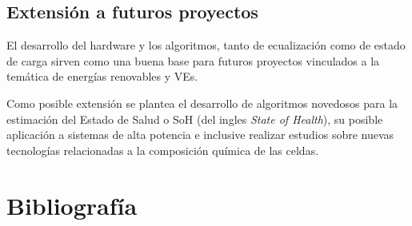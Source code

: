 \documentclass[10pt,a4paper]{article}
\begin{document}
	\subsection{Extensión a futuros proyectos}
	
	El desarrollo del hardware y los algoritmos, tanto de ecualización como de 
    estado de carga sirven como una buena base para futuros proyectos vinculados 
    a la temática de energías renovables y VEs.

	Como posible extensión se plantea el desarrollo de algoritmos novedosos para 
    la estimación del Estado de Salud o SoH (del ingles \emph{State of Health}), 
    su posible aplicación a sistemas de alta potencia e inclusive realizar 
    estudios sobre nuevas tecnologías relacionadas a la composición química de 
    las celdas.
	
	\clearpage
	
	\section{Bibliografía}
	
	 
	
	
\end{document}
